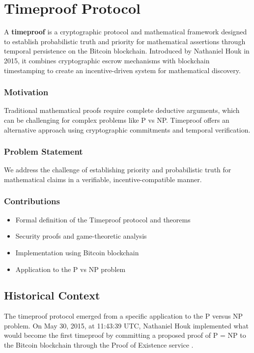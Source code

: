 \documentclass[12pt]{report}
\begin{document}
\chapter{Timeproof Protocol}

A \textbf{timeproof} is a cryptographic protocol and mathematical framework designed to establish probabilistic truth and priority for mathematical assertions through temporal persistence on the Bitcoin blockchain. Introduced by Nathaniel Houk in 2015, it combines cryptographic escrow mechanisms with blockchain timestamping to create an incentive-driven system for mathematical discovery.

\subsection{Motivation}
Traditional mathematical proofs require complete deductive arguments, which can be challenging for complex problems like P vs NP. Timeproof offers an alternative approach using cryptographic commitments and temporal verification.

\subsection{Problem Statement}
We address the challenge of establishing priority and probabilistic truth for mathematical claims in a verifiable, incentive-compatible manner.

\subsection{Contributions}
\begin{itemize}
    \item Formal definition of the Timeproof protocol and theorems
    \item Security proofs and game-theoretic analysis
    \item Implementation using Bitcoin blockchain
    \item Application to the P vs NP problem
\end{itemize}

\section{Historical Context}

The timeproof protocol emerged from a specific application to the P versus NP problem. On May 30, 2015, at 11:43:39 UTC, Nathaniel Houk implemented what would become the first timeproof by committing a proposed proof of P = NP to the Bitcoin blockchain through the Proof of Existence service \cite{proofofexistence}.
\end{document}
